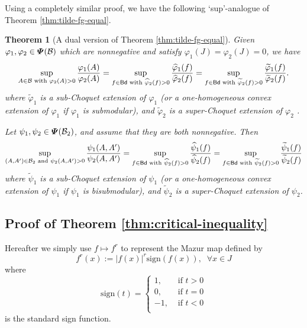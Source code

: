 \documentclass[12pt,a4paper]{article}
\newtheorem{theorem}{Theorem}[section]
\begin{document}
Using a completely similar proof,  we have the following `sup'-analogue of Theorem \ref{thm:tilde-fg-equal}.
\begin{theorem}[A dual version of Theorem \ref{thm:tilde-fg-equal}] \label{th:dual-main}
Given $\varphi_1,\varphi_2\in\bm{\varPsi}(\mathcal{B})$ which are nonnegative and satisfy $\varphi_1(J)=\varphi_2(J)=0$, we have 
\begin{equation}\label{eq:Choquet-identity/sup}
\sup_{A\in\mathcal{B}\text{ with }\varphi_2(A)>0}\frac{\varphi_1(A)}{\varphi_2(A)} =\sup_{f\in {\sf Bd}\text{ with }\widehat{\varphi}_2(f)>0}\frac{\widehat{\varphi}_1(f)}{\widehat{\varphi}_2(f)}   =\sup_{f\in {\sf Bd}\text{ with }\widetilde{\varphi}_2(f)>0}\frac{\widetilde{\varphi}_1(f)}{\widetilde{\varphi}_2(f)} .  
\end{equation}
where $\widetilde{\varphi}_1$ is a sub-Choquet extension  of $\varphi_1$ (or a one-homogeneous convex extension of $\varphi_1$ if $\varphi_1$ is submodular), and $\widetilde{\varphi}_2$ is a super-Choquet extension  of $\varphi_2$ . 

Let $\psi_1, \psi_2 \in \bm{\varPsi}(\mathcal{B}_2)$, and assume that they are both nonnegative. 
Then \begin{equation}\label{eq:Choquet-pair-identity/sup}
\sup_{(A,A')\in \mathcal{B}_2\text{ and }\psi_2(A,A')>0}\frac{\psi_1(A,A')}{\psi_2(A,A')}=\sup_{f\in {\sf Bd}\text{ with }\widehat{\psi}_2(f)>0}\frac{\widehat{\psi}_1(f)}{\widehat{\psi}_2(f)}=\sup_{f\in {\sf Bd}\text{ with }\widetilde{\psi}_2(f)>0}\frac{\widetilde{\psi}_1(f)}{\widetilde{\psi}_2(f)}   
\end{equation}
where $\widetilde{\psi}_1$ is a sub-Choquet extension  of $\psi_1$  (or a one-homogeneous convex extension of $\psi_1$ if $\psi_1$ is bisubmodular), and $\widetilde{\psi}_2$ is a super-Choquet extension of $\psi_2$.
\end{theorem}

\subsection{Proof of Theorem \ref{thm:critical-inequality}}

Hereafter we simply use $f\mapsto f^r$ to represent the Mazur map %
defined by 
\begin{equation}\label{eq:Mazur-map}
f^r(x):=|f(x)|^r\mathrm{sign}(f(x)),\;\;\forall x\in J    
\end{equation}
where $$\mathrm{sign}(t)=\begin{cases}
1,&\text{ if }t>0\\
0,&\text{ if } t=0\\
-1,&\text{ if } t<0\\
\end{cases}$$ is the standard sign function.
\end{document}

